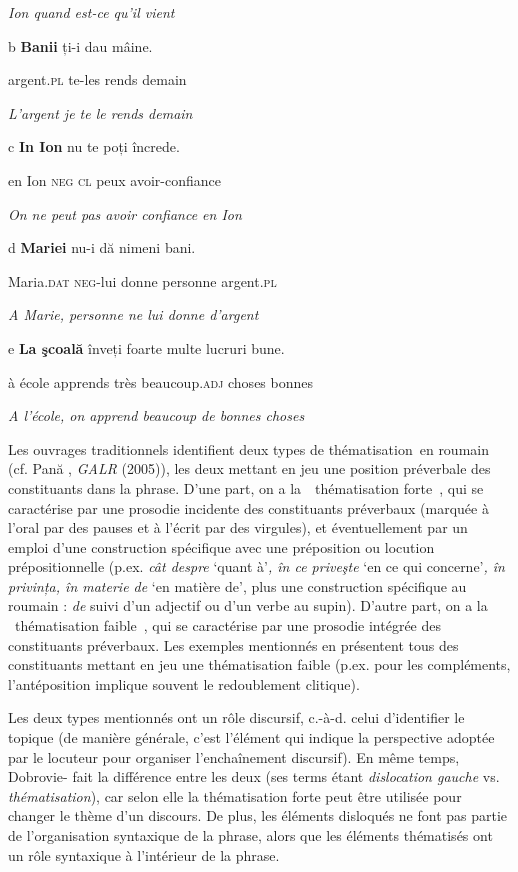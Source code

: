 \textit{Ion quand est-ce qu'il vient}  

  b  \textbf{Banii}  ți-i  dau  mâine. 

    argent.\textsc{pl } te-les  rends  demain

    \textit{L'argent je te le rends demain}

  c  \textbf{In  Ion}  nu  te  poți  încrede.

    en  Ion  \textsc{neg  cl } peux  avoir-confiance\textsc{} 

    \textit{On ne peut pas avoir confiance en Ion}

  d  \textbf{Mariei}  nu-i  dă  nimeni  bani. 

    Maria\textsc{.dat  neg-}lui  donne  personne  argent.\textsc{pl} 

    \textit{A Marie, personne ne lui donne d'argent}

  e  \textbf{La  şcoală } înveți  foarte  multe  lucruri  bune. 

    à  école  apprends  très  beaucoup.\textsc{adj}  choses  bonnes

    \textit{A l'école, on apprend beaucoup de bonnes choses}

Les ouvrages traditionnels identifient deux types de thématisation~en roumain (cf. Pană \citet{Dindelegan2003}, \textit{GALR} (2005)), les deux mettant en jeu une position préverbale des constituants dans la phrase. D'une part, on a la~{\guillemotleft}~thématisation forte~{\guillemotright}, qui se caractérise par une prosodie incidente des constituants préverbaux (marquée à l'oral par des pauses et à l'écrit par des virgules), et éventuellement par un emploi d'une construction spécifique avec une préposition ou locution prépositionnelle (p.ex. \textit{cât despre} `quant à'\textit{, în ce priveşte} `en ce qui concerne'\textit{, în privința, în materie de} `en matière de', plus une construction spécifique au roumain :\textit{ de} suivi d'un adjectif ou d'un verbe au supin). D'autre part, on a la {\guillemotleft}~thématisation faible~{\guillemotright}, qui se caractérise par une prosodie intégrée des constituants préverbaux. Les exemples mentionnés en  présentent tous des constituants mettant en jeu une thématisation faible (p.ex. pour les compléments, l'antéposition implique souvent le redoublement clitique). 

Les deux types mentionnés ont un rôle discursif, c.-à-d. celui d'identifier le topique (de manière générale, c'est l'élément qui indique la perspective adoptée par le locuteur pour organiser l'enchaînement discursif). En même temps, Dobrovie-\citet{Sorin1987} fait la différence entre les deux (ses terms étant \textit{dislocation gauche} vs.\textit{ thématisation}), car selon elle la thématisation forte peut être utilisée pour changer le thème d'un discours. De plus, les éléments disloqués ne font pas partie de l'organisation syntaxique de la phrase, alors que les éléments thématisés ont un rôle syntaxique à l'intérieur de la phrase.

